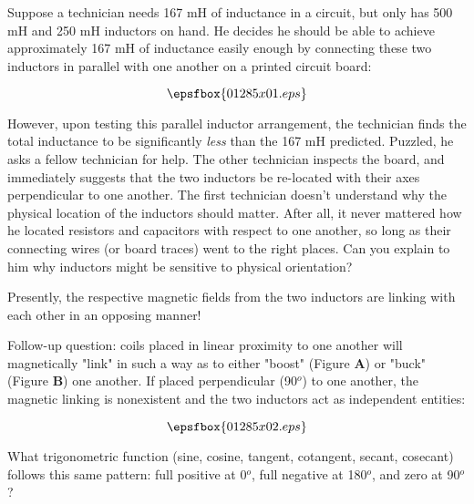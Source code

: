

Suppose a technician needs 167 mH of inductance in a circuit, but only has 500 mH and 250 mH inductors on hand.  He decides he should be able to achieve approximately 167 mH of inductance easily enough by connecting these two inductors in parallel with one another on a printed circuit board:

$$\epsfbox{01285x01.eps}$$

However, upon testing this parallel inductor arrangement, the technician finds the total inductance to be significantly {\it less} than the 167 mH predicted.  Puzzled, he asks a fellow technician for help.  The other technician inspects the board, and immediately suggests that the two inductors be re-located with their axes perpendicular to one another.  The first technician doesn't understand why the physical location of the inductors should matter.  After all, it never mattered how he located resistors and capacitors with respect to one another, so long as their connecting wires (or board traces) went to the right places.  Can you explain to him why inductors might be sensitive to physical orientation?







Presently, the respective magnetic fields from the two inductors are linking with each other in an opposing manner!

\vskip 10pt

Follow-up question: coils placed in linear proximity to one another will magnetically "link" in such a way as to either "boost" (Figure {\bf A}) or "buck" (Figure {\bf B}) one another.  If placed perpendicular (90$^{o}$) to one another, the magnetic linking is nonexistent and the two inductors act as independent entities:

$$\epsfbox{01285x02.eps}$$

What trigonometric function (sine, cosine, tangent, cotangent, secant, cosecant) follows this same pattern: full positive at 0$^{o}$, full negative at 180$^{o}$, and zero at 90$^{o}$?






